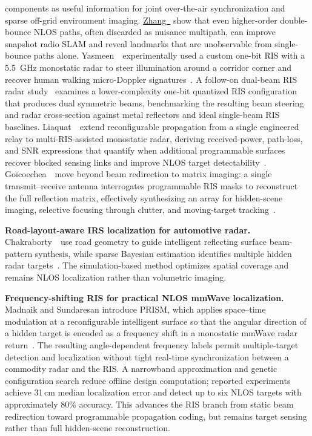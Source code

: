 components as useful information for joint over-the-air synchronization and sparse off-grid environment imaging. \href{https://arxiv.org/abs/2603.02832}{Zhang~\etal} show that even higher-order double-bounce NLOS paths, often discarded as nuisance multipath, can improve snapshot radio SLAM and reveal landmarks that are unobservable from single-bounce paths alone. Yasmeen~\etal~experimentally used a custom one-bit RIS with a 5.5~GHz monostatic radar to steer illumination around a corridor corner and recover human walking micro-Doppler signatures~\cite{yasmeenAroundCornerRIS2024}. A follow-on dual-beam RIS radar study~\cite{yasmeenDualBeamRIS2026} examines a lower-complexity one-bit quantized RIS configuration that produces dual symmetric beams, benchmarking the resulting beam steering and radar cross-section against metal reflectors and ideal single-beam RIS baselines.
 Liaquat~\etal~extend reconfigurable propagation from a single engineered relay to multi-RIS-assisted monostatic radar, deriving received-power, path-loss, and SNR expressions that quantify when additional programmable surfaces recover blocked sensing links and improve NLOS target detectability~\cite{liaquatMultiRISNLOS2025}. Go{\"i}coechea~\etal~move beyond beam redirection to matrix imaging: a single transmit--receive antenna interrogates programmable RIS masks to reconstruct the full reflection matrix, effectively synthesizing an array for hidden-scene imaging, selective focusing through clutter, and moving-target tracking~\cite{goicoecheaSingleAntennaRISNLOS2025}.


\vspace{0.8mm}
\noindent \textbf{Road-layout-aware IRS localization for automotive radar.}
Chakraborty~\etal~use road geometry to guide intelligent reflecting surface beam-pattern synthesis, while sparse Bayesian estimation identifies multiple hidden radar targets~\cite{chakraborty2025irsautomotivenlos}. The simulation-based method optimizes spatial coverage and remains NLOS localization rather than volumetric imaging.

\vspace{0.8mm}
\noindent \textbf{Frequency-shifting RIS for practical NLOS mmWave localization.}
Madnaik and Sundaresan introduce PRISM, which applies space--time modulation at a reconfigurable intelligent surface so that the angular direction of a hidden target is encoded as a frequency shift in a monostatic mmWave radar return~\cite{madnaikPRISMRISNLOS2025}. The resulting angle-dependent frequency labels permit multiple-target detection and localization without tight real-time synchronization between a commodity radar and the RIS. A narrowband approximation and genetic configuration search reduce offline design computation; reported experiments achieve 31\,cm median localization error and detect up to six NLOS targets with approximately 80\% accuracy. This advances the RIS branch from static beam redirection toward programmable propagation coding, but remains target sensing rather than full hidden-scene reconstruction.

